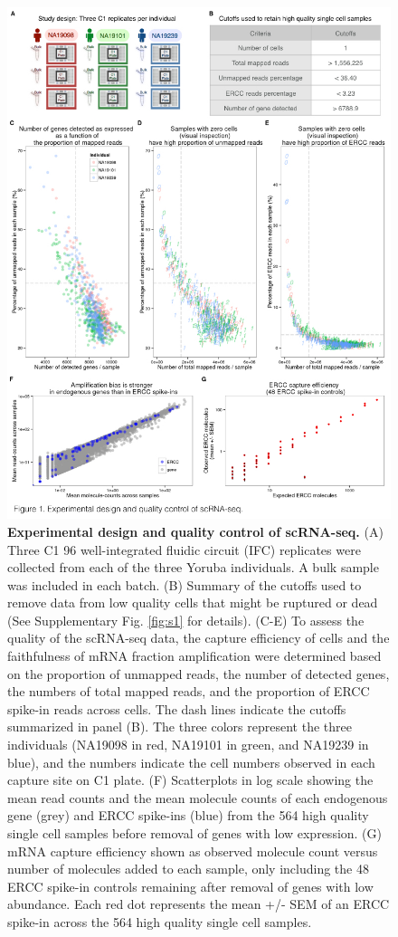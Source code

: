 \begin{figure}[htbp]
\centering
\includegraphics[trim=0 .5in 0 0,clip,width=5in]{img/ch04/Figure01.jpeg}
\caption[Experimental design and quality control of
scRNA-seq.]{\textbf{Experimental design and quality control of
scRNA-seq.} (A) Three C1 96 well-integrated fluidic circuit (IFC)
replicates were collected from each of the three Yoruba individuals. A
bulk sample was included in each batch. (B) Summary of the cutoffs used
to remove data from low quality cells that might be ruptured or dead
(See Supplementary Fig. \ref{fig:s1} for details). (C-E) To assess the quality of
the scRNA-seq data, the capture efficiency of cells and the faithfulness
of mRNA fraction amplification were determined based on the proportion
of unmapped reads, the number of detected genes, the numbers of total
mapped reads, and the proportion of ERCC spike-in reads across cells.
The dash lines indicate the cutoffs summarized in panel (B). The three
colors represent the three individuals (NA19098 in red, NA19101 in
green, and NA19239 in blue), and the numbers indicate the cell numbers
observed in each capture site on C1 plate. (F) Scatterplots in log scale
showing the mean read counts and the mean molecule counts of each
endogenous gene (grey) and ERCC spike-ins (blue) from the 564 high
quality single cell samples before removal of genes with low expression.
(G) mRNA capture efficiency shown as observed molecule count versus
number of molecules added to each sample, only including the 48 ERCC
spike-in controls remaining after removal of genes with low abundance.
Each red dot represents the mean +/- SEM of an ERCC spike-in across the
564 high quality single cell samples.}
\label{fig:study-design}
\end{figure}


